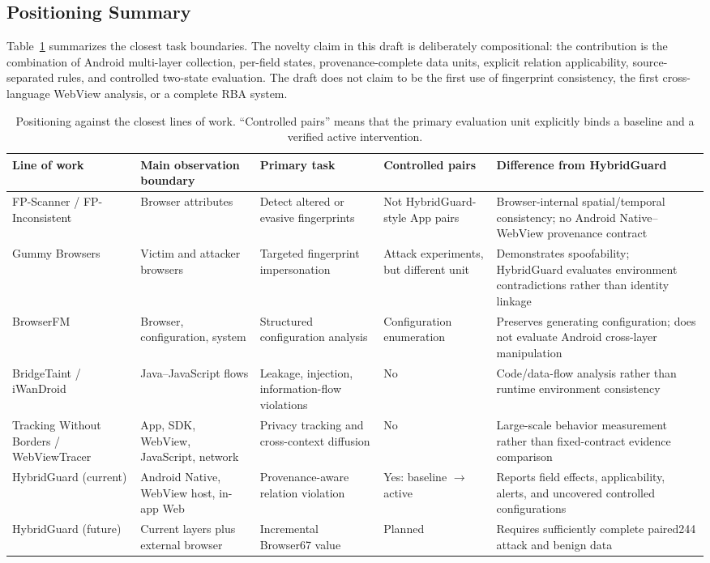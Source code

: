 \subsection{Positioning Summary}

Table~\ref{tab:positioning} summarizes the closest task boundaries. The novelty claim in this draft is deliberately compositional: the contribution is the combination of Android multi-layer collection, per-field states, provenance-complete data units, explicit relation applicability, source-separated rules, and controlled two-state evaluation. The draft does not claim to be the first use of fingerprint consistency, the first cross-language WebView analysis, or a complete RBA system.

\begin{table}[t]
\caption{Positioning against the closest lines of work. ``Controlled pairs'' means that the primary evaluation unit explicitly binds a baseline and a verified active intervention.}
\label{tab:positioning}
\small
\begin{tabularx}{\textwidth}{@{}p{2.8cm}p{2.5cm}p{2.4cm}p{2.2cm}X@{}}
\toprule
Line of work & Main observation boundary & Primary task & Controlled pairs & Difference from HybridGuard \\
\midrule
FP-Scanner / FP-Inconsistent & Browser attributes & Detect altered or evasive fingerprints & Not HybridGuard-style App pairs & Browser-internal spatial/temporal consistency; no Android Native--WebView provenance contract \\
Gummy Browsers & Victim and attacker browsers & Targeted fingerprint impersonation & Attack experiments, but different unit & Demonstrates spoofability; HybridGuard evaluates environment contradictions rather than identity linkage \\
BrowserFM & Browser, configuration, system & Structured configuration analysis & Configuration enumeration & Preserves generating configuration; does not evaluate Android cross-layer manipulation \\
BridgeTaint / iWanDroid & Java--JavaScript flows & Leakage, injection, information-flow violations & No & Code/data-flow analysis rather than runtime environment consistency \\
Tracking Without Borders / WebViewTracer & App, SDK, WebView, JavaScript, network & Privacy tracking and cross-context diffusion & No & Large-scale behavior measurement rather than fixed-contract evidence comparison \\
HybridGuard (current) & Android Native, WebView host, in-app Web & Provenance-aware relation violation & Yes: baseline $\rightarrow$ active & Reports field effects, applicability, alerts, and uncovered controlled configurations \\
HybridGuard (future) & Current layers plus external browser & Incremental Browser67 value & Planned & Requires sufficiently complete paired244 attack and benign data \\
\bottomrule
\end{tabularx}
\end{table}
